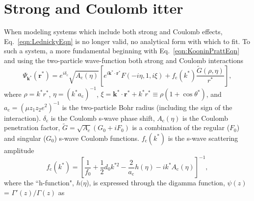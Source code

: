 \documentclass[ALICE,manyauthors]{cernphprep}
\begin{document}
\section{Strong and Coulomb {\color{red}{F}}{\color{blue}{f}}itter}
\label{App:CoulombFitter}

When modeling systems which include both strong and Coulomb effects, Eq.~\ref{eqn:LednickyEqn} is no longer valid, {\color{red}{and, in fact, there is}} {\color{blue}{and there exists}} no analytical form with which to fit.
To {\color{red}{solve such a problem, and to fit}} {\color{blue}{model}} such a system, {\color{red}{one must develop}} a more fundamental {\color{red}{model,}} {\color{blue}{approach must be taken,}} beginning with Eq.~\ref{eqn:KooninPrattEqn} and using the two-particle wave-function {\color{red}{including}} {\color{blue}{which includes}} both strong and Coulomb interactions~\cite{Lednicky:2005tb}{\color{red}{:}}{\color{blue}{,}}
\begin{equation}
 \Psi_{\mathbf{k^{*}}}(\mathbf{r^{*}}) = e^{i\delta_{\mathrm{c}}}\sqrt{A_{\mathrm{c}}(\eta)}[e^{i\mathbf{k^{*}} \cdot \mathbf{r^{*}}}F(-i\eta,1,i\xi) + f_{\mathrm{c}}(k^{*})\frac{\tilde{G}(\rho,\eta)}{r^{*}}],
\label{eqn:CoulombWaveFcn}
\end{equation}
where $\rho = k^{*}r^{*}$, $\eta = (k^{*}a_{\mathrm{c}})^{-1}$, $\xi = \mathbf{k^{*}} \cdot \mathbf{r^{*}} + k^{*}r^{*} \equiv \rho(1+\cos\theta^{*})$, and $a_{\mathrm{c}} = (\mu z_{1}z_{2}e^{2})^{-1}$ is the two-particle Bohr radius (including the sign of the interaction).  
{\color{blue}{Furthermore,}} $\delta_{\mathrm{c}}$ is the Coulomb s-wave phase shift, $A_{\mathrm{c}}(\eta)$ is the Coulomb penetration factor, $\tilde{G} = \sqrt{A_{c}}(G_{0} + iF_{0})$ is a combination of the regular ($F_{0}$) and singular ($G_{0}$) s-wave Coulomb functions.  
{\color{blue}{Finally,}} $f_{\mathrm{c}}(k^{*})$ is the s-wave scattering amplitude{\color{blue}{,}}
\begin{equation}
 f_{\mathrm{c}}(k^{*}) = \left[\frac{1}{f_{0}} + \frac{1}{2}d_{0}k^{*2} - \frac{2}{a_{\mathrm{c}}}h(\eta) - ik^{*}A_{\mathrm{c}}(\eta)\right]^{-1},
\label{eqn:CoulombScattAmp}
\end{equation}
where the ``h-function", $h(\eta$), is expressed through the digamma function, $\psi(z)$ = $\Gamma'(z)/\Gamma(z)$ as
\end{document}
